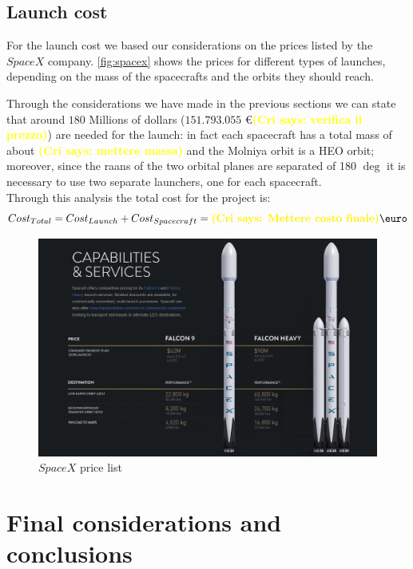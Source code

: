 \documentclass[11pt,a4paper,titlepage]{article}
\newcommand{\cri}[1]{\textcolor{yellow}{\textbf{(Cri says: #1)}}}
\begin{document}
	\subsection{Launch cost}
For the launch cost we based our considerations on the prices listed by the $SpaceX$ company. \autoref{fig:spacex} shows the prices for different types of launches, depending on the mass of the spacecrafts and the orbits they should reach.

Through the considerations we have made in the previous sections we can state that around $180$ Millions of dollars ($151.793.055$ \euro \cri{verifica il prezzo}) are needed for the launch: in fact each spacecraft has a total mass of about \cri{mettere massa} and the Molniya orbit is a HEO orbit; moreover, since the raans of the two orbital planes are separated of 180 $\deg$ it is necessary to use two separate launchers, one for each spacecraft.\\

Through this analysis the total cost for the project is:
\begin{equation}
Cost_{Total} = Cost_{Launch} + Cost_{Spacecraft} = \cri{Mettere costo finale} \text{\euro}
\end{equation}

\begin{figure}
\centering
\includegraphics[width = .9\textwidth]{Spacex.png}
\caption{$SpaceX$ price list}
\label{fig:spacex}
\end{figure}

\section{Final considerations and conclusions}
	\lipsum[1]



\end{document}
